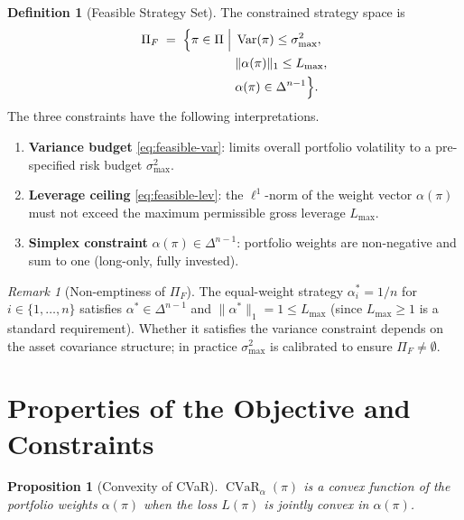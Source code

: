 \documentclass[12pt,openany]{book}
\numberwithin{equation}{chapter}
\theoremstyle{plain}
\newtheorem{proposition}[theorem]{Proposition}
\theoremstyle{definition}
\newtheorem{definition}[theorem]{Definition}
\theoremstyle{remark}
\newtheorem{remark}[theorem]{Remark}
\numberwithin{equation}{chapter}
\theoremstyle{plain}
\DeclareMathOperator{\CVaR}{CVaR}
\DeclareMathOperator{\Var}{Var}
\begin{document}
\begin{definition}[Feasible Strategy Set]
\label{def:feasible}
The constrained strategy space is
\begin{align}
  \Pi_F \;=\;
  \Bigl\{\pi \in \Pi
    \;\Big|\;
    &\Var(\pi) \leq \sigma_{\max}^2,
    \label{eq:feasible-var}\\
    &\|\alpha(\pi)\|_1 \leq L_{\max},
    \label{eq:feasible-lev}\\
    &\alpha(\pi) \in \Delta^{n-1}
  \Bigr\}.
  \label{eq:feasible}
\end{align}
The three constraints have the following interpretations.
\begin{enumerate}
  \item \textbf{Variance budget} \eqref{eq:feasible-var}: limits
        overall portfolio volatility to a pre-specified risk budget
        $\sigma_{\max}^2$.
  \item \textbf{Leverage ceiling} \eqref{eq:feasible-lev}: the
        $\ell^1$-norm of the weight vector $\alpha(\pi)$ must not
        exceed the maximum permissible gross leverage $L_{\max}$.
  \item \textbf{Simplex constraint} $\alpha(\pi) \in \Delta^{n-1}$:
        portfolio weights are non-negative and sum to one
        (long-only, fully invested).
\end{enumerate}
\end{definition}

\begin{remark}[Non-emptiness of $\Pi_F$]
\label{rem:feasible-nonempty}
The equal-weight strategy $\alpha^*_i = 1/n$ for $i \in \{1,\ldots,n\}$
satisfies $\alpha^* \in \Delta^{n-1}$ and $\|\alpha^*\|_1 = 1 \leq
L_{\max}$ (since $L_{\max} \geq 1$ is a standard requirement).
Whether it satisfies the variance constraint depends on the asset
covariance structure; in practice $\sigma_{\max}^2$ is calibrated to
ensure $\Pi_F \neq \emptyset$.
\end{remark}

\section{Properties of the Objective and Constraints}
\label{sec:obj-properties}

\begin{proposition}[Convexity of CVaR]
\label{prop:cvar-convex}
$\CVaR_\alpha(\pi)$ is a convex function of the portfolio weights
$\alpha(\pi)$ when the loss $L(\pi)$ is jointly convex in $\alpha(\pi)$.
\end{proposition}
\end{document}
